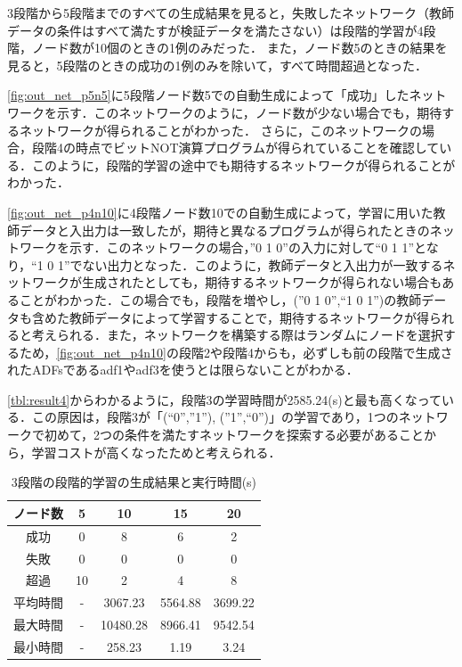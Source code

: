 \documentclass[exploratorypaper]{jsaiart} %
\begin{document}
3段階から5段階までのすべての生成結果を見ると，失敗したネットワーク（教師データの条件はすべて満たすが検証データを満たさない）は段階的学習が4段階，ノード数が10個のときの1例のみだった．
また，ノード数5のときの結果を見ると，5段階のときの成功の1例のみを除いて，すべて時間超過となった．

\ref{fig:out_net_p5n5}に5段階ノード数5での自動生成によって「成功」したネットワークを示す．このネットワークのように，ノード数が少ない場合でも，期待するネットワークが得られることがわかった．
さらに，このネットワークの場合，段階4の時点でビットNOT演算プログラムが得られていることを確認している．このように，段階的学習の途中でも期待するネットワークが得られることがわかった．

\ref{fig:out_net_p4n10}に4段階ノード数10での自動生成によって，学習に用いた教師データと入出力は一致したが，期待と異なるプログラムが得られたときのネットワークを示す．このネットワークの場合，”0 1 0”の入力に対して“0 1 1”となり，“1 0 1”でない出力となった．このように，教師データと入出力が一致するネットワークが生成されたとしても，期待するネットワークが得られない場合もあることがわかった．この場合でも，段階を増やし，(”0 1 0”,“1 0 1”)の教師データも含めた教師データによって学習することで，期待するネットワークが得られると考えられる．また，ネットワークを構築する際はランダムにノードを選択するため，\ref{fig:out_net_p4n10}の段階2や段階4からも，必ずしも前の段階で生成されたADFsであるadf1やadf3を使うとは限らないことがわかる．

\ref{tbl:result4}からわかるように，段階3の学習時間が2585.24(s)と最も高くなっている．この原因は，段階3が「(“0”,”1”), (”1”,“0”)」の学習であり，1つのネットワークで初めて，2つの条件を満たすネットワークを探索する必要があることから，学習コストが高くなったためと考えられる．


\begin{table}[htbp]
\caption{3段階の段階的学習の生成結果と実行時間(s)}
\label{tbl:result1}
\begin{tabular}{c|cccc}
    ノード数&	5&	10&	15&	20\\
    \hline \hline
    成功&	0&	8&	6&	2\\
    失敗&	0&	0&	0&	0\\
    超過&	10&	2&	4&	8\\
    \hline
    平均時間&	- &	3067.23&	5564.88&	3699.22\\
    最大時間&	- &	10480.28&	8966.41&	9542.54\\
    最小時間&	- &	258.23&	1.19&	3.24\\
    \hline
\end{tabular}
\end{table}
\end{document}
